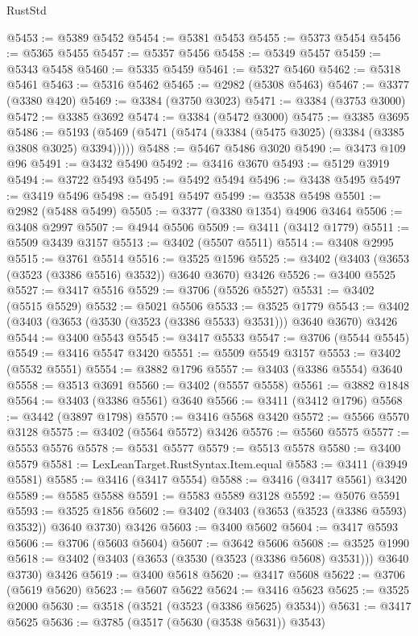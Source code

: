 \begin{lexlean}{RustStd}
\begin{coremodule}
@5453 := @5389 @5452
@5454 := @5381 @5453
@5455 := @5373 @5454
@5456 := @5365 @5455
@5457 := @5357 @5456
@5458 := @5349 @5457
@5459 := @5343 @5458
@5460 := @5335 @5459
@5461 := @5327 @5460
@5462 := @5318 @5461
@5463 := @5316 @5462
@5465 := @2982 (@5308 @5463)
@5467 := @3377 (@3380 @420)
@5469 := @3384 (@3750 @3023)
@5471 := @3384 (@3753 @3000)
@5472 := @3385 @3692
@5474 := @3384 (@5472 @3000)
@5475 := @3385 @3695
@5486 := @5193 (@5469 (@5471 (@5474 (@3384 (@5475 @3025) (@3384 (@3385 @3808 @3025) @3394)))))
@5488 := @5467 @5486 @3020
@5490 := @3473 @109 @96
@5491 := @3432 @5490
@5492 := @3416 @3670
@5493 := @5129 @3919
@5494 := @3722 @5493
@5495 := @5492 @5494
@5496 := @3438 @5495
@5497 := @3419 @5496
@5498 := @5491 @5497
@5499 := @3538 @5498
@5501 := @2982 (@5488 @5499)
@5505 := @3377 (@3380 @1354) @4906 @3464
@5506 := @3408 @2997
@5507 := @4944 @5506
@5509 := @3411 (@3412 @1779)
@5511 := @5509 @3439 @3157
@5513 := @3402 (@5507 @5511)
@5514 := @3408 @2995
@5515 := @3761 @5514
@5516 := @3525 @1596
@5525 := @3402 (@3403 (@3653 (@3523 (@3386 @5516) @3532)) @3640 @3670) @3426
@5526 := @3400 @5525
@5527 := @3417 @5516
@5529 := @3706 (@5526 @5527)
@5531 := @3402 (@5515 @5529)
@5532 := @5021 @5506
@5533 := @3525 @1779
@5543 := @3402 (@3403 (@3653 (@3530 (@3523 (@3386 @5533) @3531))) @3640 @3670) @3426
@5544 := @3400 @5543
@5545 := @3417 @5533
@5547 := @3706 (@5544 @5545)
@5549 := @3416 @5547 @3420
@5551 := @5509 @5549 @3157
@5553 := @3402 (@5532 @5551)
@5554 := @3882 @1796
@5557 := @3403 (@3386 @5554) @3640
@5558 := @3513 @3691
@5560 := @3402 (@5557 @5558)
@5561 := @3882 @1848
@5564 := @3403 (@3386 @5561) @3640
@5566 := @3411 (@3412 @1796)
@5568 := @3442 (@3897 @1798)
@5570 := @3416 @5568 @3420
@5572 := @5566 @5570 @3128
@5575 := @3402 (@5564 @5572) @3426
@5576 := @5560 @5575
@5577 := @5553 @5576
@5578 := @5531 @5577
@5579 := @5513 @5578
@5580 := @3400 @5579
@5581 := LexLeanTarget.RustSyntax.Item.equal
@5583 := @3411 (@3949 @5581)
@5585 := @3416 (@3417 @5554)
@5588 := @3416 (@3417 @5561) @3420
@5589 := @5585 @5588
@5591 := @5583 @5589 @3128
@5592 := @5076 @5591
@5593 := @3525 @1856
@5602 := @3402 (@3403 (@3653 (@3523 (@3386 @5593) @3532)) @3640 @3730) @3426
@5603 := @3400 @5602
@5604 := @3417 @5593
@5606 := @3706 (@5603 @5604)
@5607 := @3642 @5606
@5608 := @3525 @1990
@5618 := @3402 (@3403 (@3653 (@3530 (@3523 (@3386 @5608) @3531))) @3640 @3730) @3426
@5619 := @3400 @5618
@5620 := @3417 @5608
@5622 := @3706 (@5619 @5620)
@5623 := @5607 @5622
@5624 := @3416 @5623
@5625 := @3525 @2000
@5630 := @3518 (@3521 (@3523 (@3386 @5625) @3534))
@5631 := @3417 @5625
@5636 := @3785 (@3517 (@5630 (@3538 @5631)) @3543)

\end{coremodule}
\end{lexlean}
